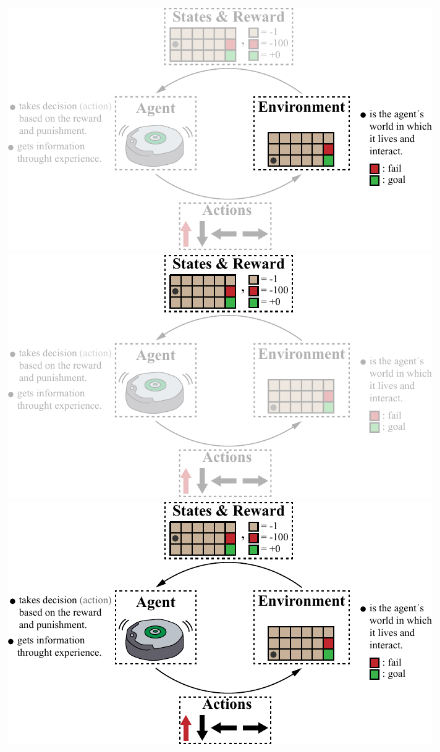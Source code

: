 \begin{frame}
\begin{figure}
\begin{overprint}
			\includegraphics{reinforcement_learning_diagram_3.pdf}
			\onslide<5>\includegraphics{reinforcement_learning_diagram_4.pdf}
			\onslide<6>\includegraphics{reinforcement_learning_diagram.pdf}
		\end{overprint}
	\end{figure}

\end{frame}


